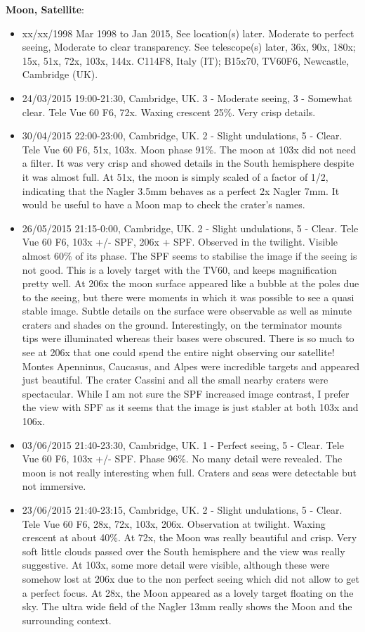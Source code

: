 {\bf Moon, Satellite}:
\begin{itemize}
\item xx/xx/1998 Mar 1998 to Jan 2015, See location(s) later. Moderate to perfect seeing, Moderate to clear transparency. See telescope(s) later, 36x, 90x, 180x; 15x, 51x, 72x, 103x, 144x. C114F8, Italy (IT); B15x70, TV60F6, Newcastle, Cambridge (UK).
\item 24/03/2015 19:00-21:30, Cambridge, UK. 3 - Moderate seeing, 3 - Somewhat clear. Tele Vue 60 F6, 72x. Waxing crescent 25\%. Very crisp details. 
\item 30/04/2015 22:00-23:00, Cambridge, UK. 2 - Slight undulations, 5 - Clear. Tele Vue 60 F6, 51x, 103x. Moon phase 91\%. The moon at 103x did not need a filter. It was very crisp and showed details in the South hemisphere despite it was almost full. At 51x, the moon is simply scaled of a factor of 1/2, indicating that the Nagler 3.5mm behaves as a perfect 2x Nagler 7mm. It would be useful to have a Moon map to check the crater's names. 
\item 26/05/2015 21:15-0:00, Cambridge, UK. 2 - Slight undulations, 5 - Clear. Tele Vue 60 F6, 103x +/- SPF, 206x + SPF. Observed in the twilight. Visible almost 60\% of its phase. The SPF seems to stabilise the image if the seeing is not good. This is a lovely target with the TV60, and keeps magnification pretty well. At 206x the moon surface appeared like a bubble at the poles due to the seeing, but there were moments in which it was possible to see a quasi stable image. Subtle details on the surface were observable as well as minute craters and shades on the ground. Interestingly, on the terminator mounts tips were illuminated whereas their bases were obscured. There is so much to see at 206x that one could spend the entire night observing our satellite! Montes Apenninus, Caucasus, and Alpes were incredible targets and appeared just beautiful. The crater Cassini and all the small nearby craters were spectacular. While I am not sure the SPF increased image contrast, I prefer the view with SPF as it seems that the image is just stabler at both 103x and 106x.
\item 03/06/2015 21:40-23:30, Cambridge, UK. 1 - Perfect seeing, 5 - Clear. Tele Vue 60 F6, 103x +/- SPF. Phase 96\%. No many detail were revealed. The moon is not really interesting when full. Craters and seas were detectable but not immersive. 
\item 23/06/2015 21:40-23:15, Cambridge, UK. 2 - Slight undulations, 5 - Clear. Tele Vue 60 F6, 28x, 72x, 103x, 206x. Observation at twilight. Waxing crescent at about 40\%. At 72x, the Moon was really beautiful and crisp. Very soft little clouds passed over the South hemisphere and the view was really suggestive. At 103x, some more detail were visible, although these were somehow lost at 206x due to the non perfect seeing which did not allow to get a perfect focus. At 28x, the Moon appeared as a lovely target floating on the sky. The ultra wide field of the Nagler 13mm really shows the Moon and the surrounding context.

\end{itemize}
